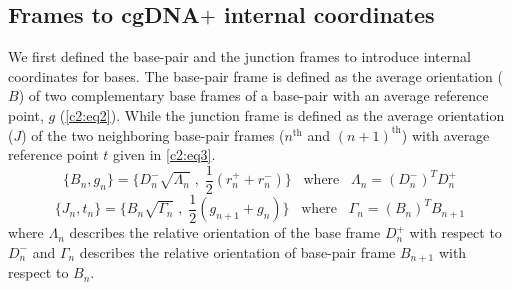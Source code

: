 \subsection{Frames to cgDNA$+$ internal coordinates}\label{c2:fra_to_int}
We first defined the base-pair and the junction frames to introduce internal coordinates for bases. The base-pair frame is defined as the average orientation ($B$) of two complementary base frames of a base-pair with an average reference point, $g$ (\cref{c2:eq2}). While the junction frame is defined as the average orientation ($J$) of the two neighboring base-pair frames ($n^\text{{th}}$ and $(n+1)^\text{{th}}$) with average reference point $t$ given in \cref{c2:eq3}.
\begin{equation}
\{ B_n,g_n \} = \{ D_{n}^{-}\sqrt{\Lambda_{n}} \; , \;  \frac{1}{2}(r_{n}^{+} + r_{n}^{-}) \} \;\;\; \text{where} \;\;\; \Lambda_{n} = (D_{n}^{-})^{T}D_{n}^{+}
\label{c2:eq2}
\end{equation}
\begin{equation}
\{ J_n,t_n \} = \{ B_{n}\sqrt{\Gamma_{n}} \; , \;  \frac{1}{2}(g_{n+1} + g_{n}) \} \;\;\; \text{where} \;\;\; \Gamma_{n} = (B_{n})^{T}B_{n+1}
\label{c2:eq3}
\end{equation}
where $\Lambda_{n}$ describes the relative orientation of the base frame $D_{n}^{+}$ with respect to $D_{n}^{-}$ and $\Gamma_{n}$ describes the relative orientation of base-pair frame $B_{n+1}$ with respect to $B_{n}$. 

